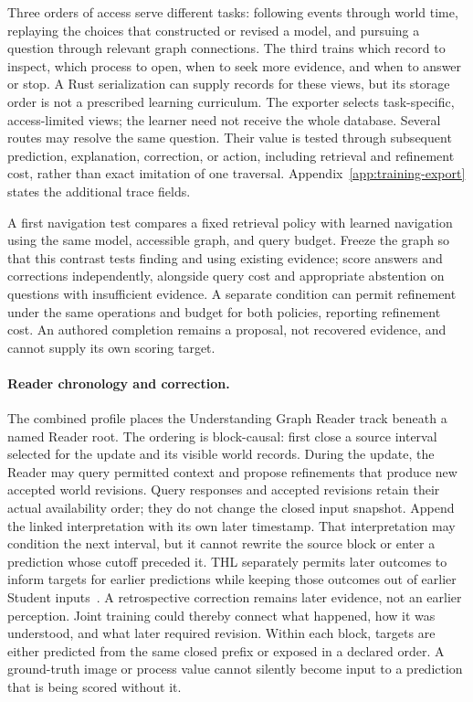 \documentclass[10pt]{article}
\begin{document}
Three orders of access serve different tasks: following events through world
time, replaying the choices that constructed or revised a model, and pursuing
a question through relevant graph connections. The third trains which record
to inspect, which process to open, when to seek more evidence, and when to
answer or stop. A Rust serialization can supply records for these views, but
its storage order is not a prescribed learning curriculum. The exporter
selects task-specific, access-limited views; the learner need not receive the
whole database. Several routes may resolve the same question. Their value is
tested through subsequent prediction, explanation, correction, or action,
including retrieval and refinement cost, rather than exact imitation of one
traversal. Appendix~\ref{app:training-export} states the additional trace fields.

A first navigation test compares a fixed retrieval policy with learned
navigation using the same model, accessible graph, and query budget. Freeze
the graph so that this contrast tests finding and using existing evidence;
score answers and corrections independently, alongside query cost and
appropriate abstention on questions with insufficient evidence. A separate
condition can permit refinement under the same operations and budget for both
policies, reporting refinement cost. An authored completion remains a proposal,
not recovered evidence, and cannot supply its own scoring target.

\paragraph{Reader chronology and correction.}
The combined profile places the Understanding Graph Reader track beneath
a named Reader root. The ordering is block-causal: first close a source
interval selected for the update and its visible world records. During the
update, the Reader may query permitted context and propose refinements that
produce new accepted world revisions. Query responses and accepted revisions
retain their actual availability order; they do not change the closed input
snapshot. Append the linked interpretation with its own later timestamp.
That interpretation may condition
the next interval, but it cannot rewrite the source block or enter a
prediction whose cutoff preceded it. THL separately permits later outcomes
to inform targets for earlier predictions while keeping those outcomes out of
earlier Student inputs~\cite{westerbergTHL2026}. A retrospective correction
remains later evidence, not an earlier perception. Joint training could thereby
connect what happened, how it was understood, and what later required revision.
Within each block, targets are either predicted from the same closed prefix
or exposed in a declared order. A ground-truth image or process value cannot
silently become input to a prediction that is being scored without it.
\end{document}
